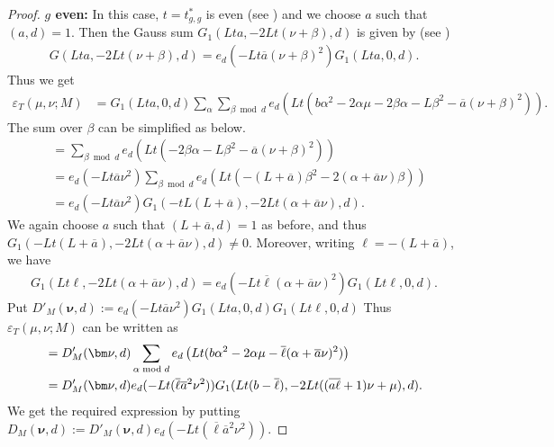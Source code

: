 \documentclass[11pt]{amsart}
\numberwithin{equation}{section}
\begin{document}
\begin{proof}
\textbf{$g$ even:} In this case, $t=t_{g,g}^*$ is even (see \cite{boche-das}) and we choose $a$ such that $(a, d)=1$.  Then the Gauss sum $G_1(Lta, -2Lt(\nu+\beta), d) $ is given by  (see \cite{berndt1998gauss})
\begin{align}
G(Lta, -2Lt(\nu+\beta), d)= e_{d}(-Lt\overline{a}(\nu+\beta)^2)G_1(Lta,0, d).
\end{align}
Thus we get
\begin{align}
\varepsilon_{T}(\mu, \nu;M)&=G_1(Lta,0, d)\sum_\alpha\sum_{\beta\bmod d}e_{d}\left(Lt(b\alpha^2-2\alpha\mu-2\beta\alpha-L\beta^2-\overline{a}(\nu+\beta)^2)\right).
\end{align}
The sum over $\beta$ can be simplified as below.
\begin{align}
&=\sum_{\beta\bmod d}e_{d}\left(Lt(-2\beta\alpha-L\beta^2-\overline{a}(\nu+\beta)^2)\right)\\
&=e_{d}(-Lt\overline{a}\nu^2)\sum_{\beta\bmod d}e_{d}\left(Lt(-(L+\overline{a})\beta^2-2(\alpha+\overline{a}\nu)\beta)\right)\\
&=e_{d}(-Lt\overline{a}\nu^2) G_1(-tL(L+\overline{a}), -2Lt(\alpha+\overline{a}\nu), d).
\end{align}
We again choose $a$ such that $(L+\overline{a}, d)=1$ as before, and thus $ G_1(-Lt(L+\overline{a}), -2Lt(\alpha+\overline{a}\nu), d)\neq 0$. Moreover, writing $\ell=-( L+\overline{a})$, we have
\begin{align}
G_1(Lt\ell, -2Lt(\alpha+\overline{a}\nu), d)= e_{d}(-Lt\overline{\ell}(\alpha+\overline{a}\nu)^2)G_1(Lt\ell, 0, d). 
\end{align}
Put $D'_M(\bm\nu, d):=e_{d}(-Lt\overline{a}\nu^2)G_1(Lta,0, d)G_1(Lt\ell, 0, d)$ Thus $\varepsilon_{T}(\mu, \nu;M)$ can be written as
\begin{align}
&=D'_M(\bm\nu, d)\sum_{\alpha\bmod d}e_{d}\left(Lt(b\alpha^2-2\alpha\mu-\overline{\ell}(\alpha+\overline{a}\nu)^2)\right)\\
&=D'_M(\bm\nu, d)e_{d}(-Lt(\overline{\ell}\overline{a}^2\nu^2))G_1(Lt(b-\overline{\ell}),-2Lt ((\overline{a\ell}+1)\nu+\mu), d).\qedhere
\end{align}
We get the required expression by putting $D_M(\bm\nu, d):=D'_M(\bm\nu, d)e_{d}(-Lt(\overline{\ell}\overline{a}^2\nu^2))$.
\end{proof}
\end{document}
